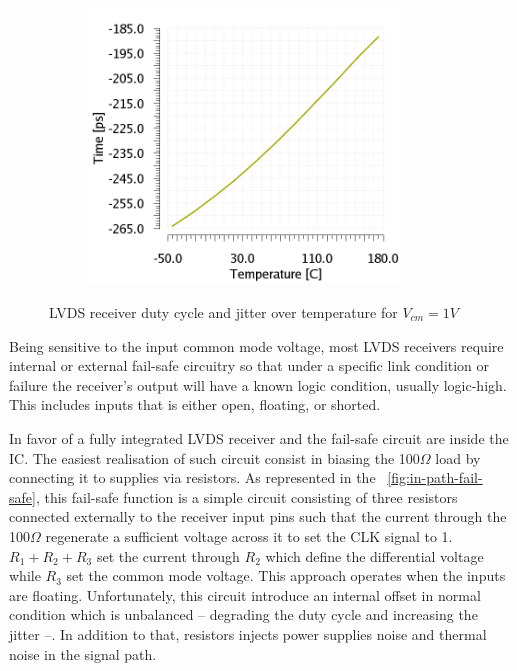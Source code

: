\begin{figure}[htp]
\begin{subfigure}[b]{0.32\textwidth}
        \includegraphics[width=0.9\textwidth]{Chapter5/Figs/lvds/ErrorClockPeriod-Vcm1V.png}
    \end{subfigure}
    \caption{LVDS receiver duty cycle and jitter over temperature for $V_{cm} = 1 V$}
    \label{fig:lvds-receiver-res1V}
\end{figure}

Being sensitive to the input common mode voltage, most LVDS receivers require internal or external fail-safe circuitry so that under a specific link condition or failure the receiver's output will have a known logic condition, usually logic-high. This includes inputs that is either open, floating, or shorted.

In favor of a fully integrated LVDS receiver and the fail-safe circuit are inside the IC\@. The easiest realisation of such circuit consist in biasing the 100$\Omega$ load by connecting it to supplies via resistors. As represented in the \figurename~\ref{fig:in-path-fail-safe}, this fail-safe function is a simple circuit consisting of three resistors connected externally to the receiver input pins such that the current through the 100$\Omega$ regenerate a sufficient voltage across it to set the CLK signal to 1. $R_1+R_2+R_3$ set the current through $R_2$ which define the differential voltage while $R_3$ set the common mode voltage. This approach operates when the inputs are floating. Unfortunately, this circuit introduce an internal offset in normal condition which is unbalanced -- degrading the duty cycle and increasing the jitter --. In addition to that, resistors injects power supplies noise and thermal noise in the signal path.

